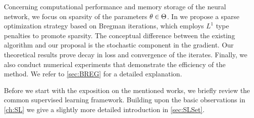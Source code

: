 Concerning computational performance and memory storage of the neural network, we focus on sparsity of the parameters $\theta\in\Theta$. In \cite{bungert2022bregman} we propose a sparse optimization strategy based on Bregman iterations, which employs $L^1$ type penalties to promote sparsity. The conceptual difference between the existing algorithm and our proposal is the stochastic component in the gradient. Our theoretical results prove decay in loss and convergence of the iterates. Finally, we also conduct numerical experiments that demonstrate the efficiency of the method. We refer to \cref{sec:BREG} for a detailed explanation.

Before we start with the exposition on the mentioned works, we briefly review the common supervised learning framework. Building upon the basic observations in \cref{ch:SL} we give a slightly more detailed introduction in \cref{sec:SLSet}.
%
%
%
%
